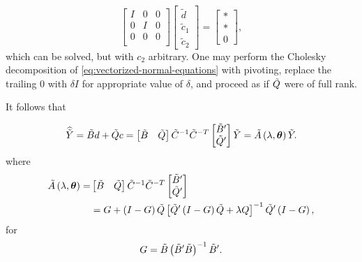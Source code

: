 \begin{equation} \label{eq:vectorized-normal-equations-cholesky-2}
\begin{bmatrix}
I & 0 & 0\\
0 & I & 0 \\
0 & 0 & 0 \\
\end{bmatrix}
\begin{bmatrix}
\tilde{d}\\
\tilde{c}_1\\
\tilde{c}_2
\end{bmatrix}
= \begin{bmatrix}
* \\
* \\
0
\end{bmatrix},
\end{equation}
\noindent
which can be solved, but with $c_2$ arbitrary. One may perform the Cholesky decomposition of \ref{eq:vectorized-normal-equations} with pivoting, replace the trailing $0$ with $\delta I$ for appropriate value of $\delta$, and proceed as if $\tilde{Q}$ were of full rank. 
\bigskip

It follows that

\begin{equation} \label{eq:tildeY-hat-equals-tildeA-tildeY}
\widehat{\tilde{Y}} = \tilde{B} d + \tilde{Q} c = \begin{bmatrix} \tilde{B} & \tilde{Q} \end{bmatrix} \tilde{C}^{-1} \tilde{C}^{-T} \begin{bmatrix} \tilde{B}' \\ \tilde{Q}' \end{bmatrix} \tilde{Y} = \tilde{A}\left(\lambda, \mbox{\boldmath $\theta$}\right) \tilde{Y}.
\end{equation} 
\noindent
where
\begin{align}
\begin{split} \label{eq:smoothing-matrix-A-tilde}
\tilde{A}\left(\lambda, \mbox{\boldmath $\theta$} \right) =& \begin{bmatrix} \tilde{B} & \tilde{Q} \end{bmatrix} \tilde{C}^{-1} \tilde{C}^{-T} \begin{bmatrix} \tilde{B}' \\ \tilde{Q}' \end{bmatrix}  \\
&= G + \left(I - G\right) \tilde{Q} \left[\tilde{Q}'\left( I - G \right)\tilde{Q} + \lambda Q\right]^{-1} \tilde{Q}'\left(I - G\right),
\end{split}
\end{align} 
\noindent
for
\[
G = \tilde{B}\left(\tilde{B}' \tilde{B} \right)^{-1}\tilde{B}'.
\]



